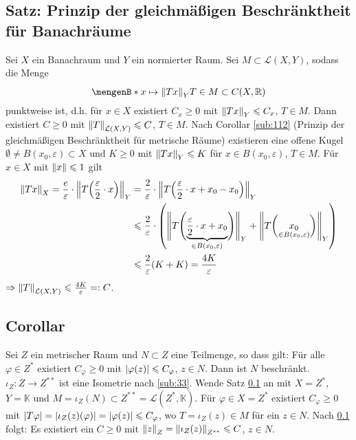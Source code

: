 \subsection{Satz: Prinzip der gleichmäßigen Beschränktheit für Banachräume} %
\label{sub:35}
Sei $X$ ein Banachraum und $Y$ ein normierter Raum. Sei $M \subset \mathcal{L}(X,Y)$, sodass die Menge 
\[
	\set[{x \mapsto \norm[Y]{T x}}]{T \in M \rule{0cm}{1em}} \subset C(X,\mathds{R} )
\]
punktweise  ist, d.h. für $x \in X$ existiert $C_x \ge 0$ mit $\norm[Y]{T x} \le C_x$, $T \in M$. Dann existiert $C \ge 0$ mit $\norm[\mathcal{L}(X,Y)]{T} \le C$,
$T \in M$.
Nach Corollar \ref{sub:112} (Prinzip der gleichmäßigen Beschränktheit für metrische Räume) existieren eine offene Kugel $\emptyset \not= B(x_0,\varepsilon) \subset X$ und 
$K \ge 0$ mit $\norm[Y]{T x} \le K$ für $x \in B(x_0, \varepsilon)$, $T \in M$. Für $x \in X$ mit $\norm{x} \le 1$ gilt 
\begin{align*}
	\norm[X]{T x} = \frac{e}{\varepsilon} \cdot  \norm[Y]{T \enbrace*{\frac{\varepsilon}{2} \cdot x}} &= \frac{2}{\varepsilon} \cdot 
	\norm[Y]{T \enbrace*{\frac{\varepsilon}{2} \cdot x + x_0 - x_0 } }  \\
	&\le \frac{2}{\varepsilon} \cdot   \enbrace*{ \doppelstrich[\Bigg]{T \enbrace[\Bigg]{\underbrace{\frac{\varepsilon}{2} \cdot x + x_0}_{\in B(x_0,\varepsilon)} } }_Y +
	 \norm[Y]{T  \enbrace[\bigg]{\underset{\in B(x_0,\varepsilon)}{x_0}} }} \\
	&\le \frac{2}{\varepsilon} (K+K) = \frac{4K}{\varepsilon}   
\end{align*}
$\Rightarrow \norm[\mathcal{L}(X,Y)]{T} \le \frac{4 K}{\varepsilon} =: C$. \bewende

\subsection{Corollar} %
\label{sub:36}
Sei $Z$ ein metrischer Raum und $N \subset Z$ eine Teilmenge, so dass gilt: Für alle $\varphi \in Z^*$ existiert $C_\varphi \ge 0$ mit $\abs*{\varphi(z)} \le C_\varphi$, 
$z \in N$.  Dann ist $N$ beschränkt.
$\iota_Z : Z \to Z^{**}$ ist eine Isometrie nach \ref{sub:33}. Wende Satz \ref{sub:35} an mit $X=Z^{*}$, $Y=\mathds{K}$ und 
$M = \iota_Z(N) \subset Z^{**}= \mathcal{L}(Z^*,\mathds{K})$.
Für $\varphi \in X = Z^{*}$ existiert $C_\varphi \ge 0$ mit $\abs*{T \varphi} = \abs*{\iota_Z(z) (\varphi)} = \abs*{\varphi(z)} \le C_\varphi$, wo $T= \iota_Z(z) \in M$
für ein $z \in N$. Nach \ref{sub:35} folgt: Es existiert ein $C \ge 0$ mit $\norm[Z]{z} = \norm[Z^{**}]{\iota_Z(z)}  \le C$, $z \in N$. \bewende

